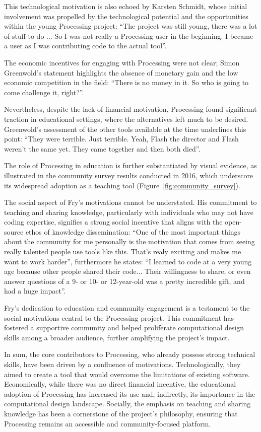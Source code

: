 This technological motivation is also echoed by Karsten Schmidt, whose initial involvement was propelled by the technological potential and the opportunities within the young Processing project: \enquote{The project was still young, there was a lot of stuff to do ... So I was not really a Processing user in the beginning. I became a user as I was contributing code to the actual tool}.

The economic incentives for engaging with Processing were not clear; Simon Greenwold’s statement highlights the absence of monetary gain and the low economic competition in the field: \enquote{There is no money in it. So who is going to come challenge it, right?}.

Nevertheless, despite the lack of financial motivation, Processing found significant traction in educational settings, where the alternatives left much to be desired. Greenwold’s assessment of the other tools available at the time underlines this point: \enquote{They were terrible. Just terrible. Yeah, Flash the director and Flash weren’t the same yet. They came together and then both died}.

The role of Processing in education is further substantiated by visual evidence, as illustrated in the community survey results conducted in 2016, which underscore its widespread adoption as a teaching tool (Figure~\ref{fig:community_survey}).

The social aspect of Fry’s motivations cannot be understated. His commitment to teaching and sharing knowledge, particularly with individuals who may not have coding expertise, signifies a strong social incentive that aligns with the open-source ethos of knowledge dissemination: \enquote{One of the most important things about the community for me personally is the motivation that comes from seeing really talented people use tools like this. That’s realy exciting and makes me want to work harder}, furthermore he states: \enquote{I learned to code at a very young age because other people shared their code... Their willingness to share, or even answer questions of a 9- or 10- or 12-year-old was a pretty incredible gift, and had a huge impact}.

Fry’s dedication to education and community engagement is a testament to the social motivations central to the Processing project. This commitment has fostered a supportive community and helped proliferate computational design skills among a broader audience, further amplifying the project’s impact.

In sum, the core contributors to Processing, who already possess strong technical skills, have been driven by a confluence of motivations. Technologically, they aimed to create a tool that would overcome the limitations of existing software. Economically, while there was no direct financial incentive, the educational adoption of Processing has increased its use and, indirectly, its importance in the computational design landscape. Socially, the emphasis on teaching and sharing knowledge has been a cornerstone of the project’s philosophy, ensuring that Processing remains an accessible and community-focused platform.

